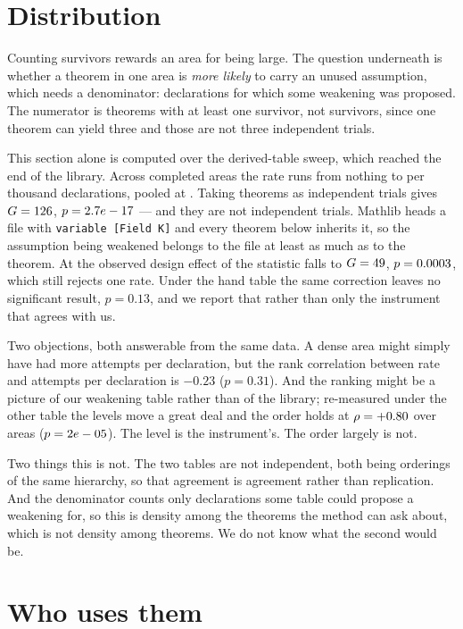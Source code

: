 \documentclass[11pt]{article}
\begin{document}
\section{Distribution}\label{sec:density}

Counting survivors rewards an area for being large. The question underneath is
whether a theorem in one area is \emph{more likely} to carry an unused
assumption, which needs a denominator: declarations for which some weakening was
proposed. The numerator is theorems with at least one survivor, not survivors,
since one theorem can yield three and those are not three independent trials.

This section alone is computed over the derived-table sweep, which reached the
end of the library. Across \densityAreas{} completed areas the rate runs from
nothing to \densityDensestRate{} per thousand declarations, pooled at
\densityPooled{}. Taking theorems as independent trials gives
$G = 126{}$, $p = 2.7e-17{}$ --- and they are not independent trials.
Mathlib heads a file with \texttt{variable [Field K]} and every theorem below
inherits it, so the assumption being weakened belongs to the file at least as
much as to the theorem. At the observed design effect of \densityDeff{} the
statistic falls to $G = 49{}$,
$p = 0.0003{}$, which still rejects one rate. Under the hand table
the same correction leaves no significant result, $p = 0.13$, and we report that
rather than only the instrument that agrees with us.

Two objections, both answerable from the same data. A dense area might simply
have had more attempts per declaration, but the rank correlation between rate
and attempts per declaration is $-0.23$ ($p = 0.31$). And the ranking might be a
picture of our weakening table rather than of the library; re-measured under the
other table the levels move a great deal and the order holds at
$\rho = +0.80{}$ over \densityCrossN{} areas
($p = 2e-05{}$). The level is the instrument's. The order largely is
not.

Two things this is not. The two tables are not independent, both being orderings
of the same hierarchy, so that agreement is agreement rather than replication.
And the denominator counts only declarations some table could propose a
weakening for, so this is density among the theorems the method can ask about,
which is not density among theorems. We do not know what the second would be.

\section{Who uses them}\label{sec:used}
\end{document}
